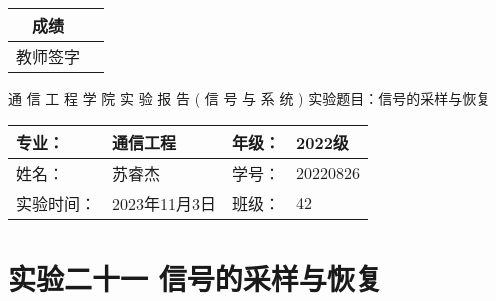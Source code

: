 \documentclass[dvipsnames, svgnames,a4paper,11pt]{article}
\begin{document}
\begin{table}
  \raggedleft
	\renewcommand\arraystretch{1.7}
	\begin{tabular}{|c|p{4em}|}
	\hline
	成绩 &  \\
	\hline
	教师签字 &   \\
	\hline
	\end{tabular}
\end{table}

\begin{center}
	{\kaishu \LARGE   \quad  \quad 通  \quad 信  \quad 工  \quad 程  \quad 学  \quad 院 }
  \newline
  \newline
  \newline
  \newline
  \newline
  {\kaishu \Huge 实 \quad  \quad  \quad 验  \quad  \quad  \quad 报 \quad  \quad  \quad 告}
  \newline
  \newline
  \newline
  \newline
  \newline
  {\songti \Huge  ( \quad  信  \quad 号  \quad 与  \quad 系  \quad 统 \quad)}
  \newline
  \newline
  \newline
  \newline
  \newline
  {\songti  \LARGE 实验题目：信号的采样与恢复  \quad  \quad \quad}
\end{center}



\begin{table}[b]
	\renewcommand\arraystretch{1.7}
	\begin{tabularx}{\textwidth}{|X|X|X|X|}
	\hline
	专业：& 通信工程 &年级：& 2022级\\
	\hline
	姓名：& 苏睿杰  & 学号：& 20220826\\
	\hline
	实验时间：& 2023年11月3日 & 班级：& 42 \\
	\hline
	\end{tabularx}
\end{table}



\clearpage
\setcounter{section}{0}
\section{实验二十一 \quad 信号的采样与恢复}
\end{document}
